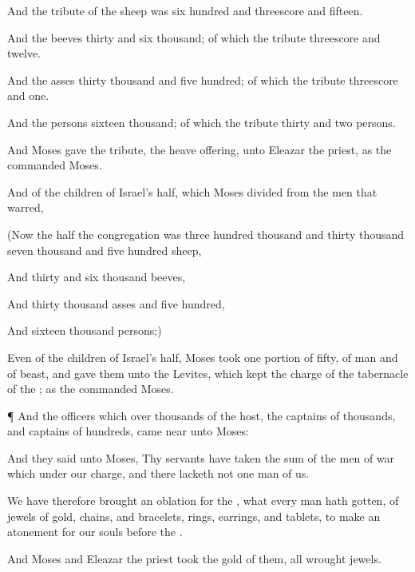 {And the
{}
tribute of the
sheep was
six
hundred and threescore and
fifteen.

And the
beeves
{}
thirty and
six
thousand; of which the
{}
tribute
{} threescore and
twelve.

And the
asses
{}
thirty
thousand and
five
hundred; of which the
{}
tribute
{}
threescore and
one.

And the
persons
{}
sixteen
thousand; of which the
{}
tribute
{}
thirty and
two
persons.

And
Moses
gave the
tribute,
{} the
{} heave
offering, unto
Eleazar the
priest, as the
{}
commanded
Moses.

And of the
children of
Israel’s
half, which
Moses
divided from the
men that
warred,

(Now the
half
{} the
congregation was
three
hundred
thousand and
thirty
thousand
{}
seven
thousand and
five
hundred
sheep,

And
thirty and
six
thousand
beeves,

And
thirty
thousand
asses and
five
hundred,

And
sixteen
thousand
persons;)

Even of the
children of
Israel’s
half,
Moses
took
one
portion of
fifty,
{} of
man and of
beast, and
gave them unto the
Levites, which
kept the
charge of the
tabernacle of the
{}; as the
{}
commanded
Moses.


\par }{\PP {}¶ And the
officers which
{} over
thousands of the
host, the
captains of
thousands, and
captains of
hundreds, came
near unto
Moses:

And they
said unto
Moses, Thy
servants have
taken the
sum of the
men of
war which
{} under our
charge, and there
lacketh not one
man of us.

We have therefore
brought an
oblation for the
{}, what every
man hath
gotten, of
jewels of
gold,
chains, and
bracelets,
rings,
earrings, and
tablets, to make an
atonement for our
souls
before the
{}.

And
Moses and
Eleazar the
priest
took the
gold of them,
{} all
wrought
jewels.

}
